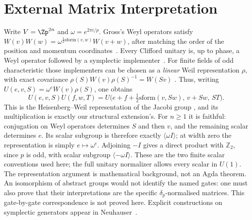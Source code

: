 \section{External Matrix Interpretation}\label{sec:matrix-background}
Write $V=\Zp^{2n}$ and $\omega=e^{2\pi i/p}$.  Gross's Weyl
operators satisfy $W(v)W(w)=\omega^{\frac12\mathrm{sform}(v,w)}
W(v+w)$, after matching the order of the position and momentum
coordinates~\cite[\S II.1, Eq.~(4)]{gross2006hudson}.
Every Clifford unitary is, up to phase, a Weyl operator followed by
a symplectic implementer~\cite[Theorem~3]{gross2006hudson}.
For finite fields of odd characteristic those implementers can be
chosen as a \emph{linear} Weil representation $\rho$, with exact
covariance $\rho(S)W(v)\rho(S)^{-1}=W(Sv)$
\cite[Theorem~1.3.2]{gurevich2007geometric}.
Thus, writing $U(e,v,S)=\omega^e W(v)\rho(S)$, one obtains
\[
 U(e,v,S)U(f,w,T)
 =U\bigl(e+f+\tfrac12\mathrm{sform}(v,Sw),\,v+Sw,\,ST\bigr).
\]
This is the Heisenberg--Weil representation of the Jacobi group
\cite[\S 1.3]{gurevich2010bounds}, and its multiplication is exactly
our structural extension's.  For $n\geq1$ it is faithful: conjugation
on Weyl operators determines $S$ and then $v$, and the remaining
scalar determines $e$.  Its scalar subgroup is therefore exactly
$\langle\omega I\rangle$; at width zero the representation is simply
$e\mapsto\omega^e$.
Adjoining $-I$ gives a direct product with $\mathbb Z_2$, since $p$ is
odd, with scalar subgroup $\langle-\omega I\rangle$.
These are the two finite scalar conventions used here; the full
unitary normalizer allows every scalar in $U(1)$.
The representation argument is mathematical background, not an Agda
theorem.  An isomorphism of abstract groups would not identify the named gates:
one must also prove that their interpretations are the specific
$\delta_p$-normalised matrices. This gate-by-gate correspondence is
not proved here. Explicit constructions on symplectic generators appear in
Neuhauser~\cite{neuhauser2002metaplectic}.

